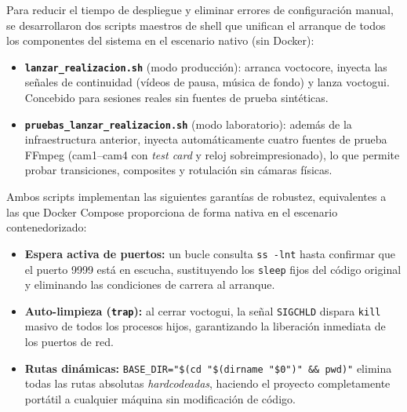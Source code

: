 Para reducir el tiempo de despliegue y eliminar errores de configuración manual, se
desarrollaron dos scripts maestros de shell que unifican el arranque de todos los
componentes del sistema en el escenario nativo (sin Docker):

\begin{itemize}
  \item \textbf{\texttt{lanzar\_realizacion.sh}} (modo producción): arranca voctocore,
        inyecta las señales de continuidad (vídeos de pausa, música de fondo) y lanza
        voctogui. Concebido para sesiones reales sin fuentes de prueba sintéticas.
  \item \textbf{\texttt{pruebas\_lanzar\_realizacion.sh}} (modo laboratorio): además de
        la infraestructura anterior, inyecta automáticamente cuatro fuentes de prueba
        FFmpeg (cam1--cam4 con \textit{test card} y reloj sobreimpresionado), lo que
        permite probar transiciones, composites y rotulación sin cámaras físicas.
\end{itemize}

Ambos scripts implementan las siguientes garantías de robustez, equivalentes a las que
Docker Compose proporciona de forma nativa en el escenario contenedorizado:

\begin{itemize}
  \item \textbf{Espera activa de puertos:} un bucle consulta \texttt{ss -lnt} hasta
        confirmar que el puerto 9999 está en escucha, sustituyendo los \texttt{sleep}
        fijos del código original y eliminando las condiciones de carrera al arranque.
  \item \textbf{Auto-limpieza (\texttt{trap}):} al cerrar voctogui, la señal
        \texttt{SIGCHLD} dispara \texttt{kill} masivo de todos los procesos hijos,
        garantizando la liberación inmediata de los puertos de red.
  \item \textbf{Rutas dinámicas:} \texttt{BASE\_DIR="\$(cd "\$(dirname "\$0")" \&\& pwd)"}
        elimina todas las rutas absolutas \textit{hardcodeadas}, haciendo el proyecto
        completamente portátil a cualquier máquina sin modificación de código.
\end{itemize}
